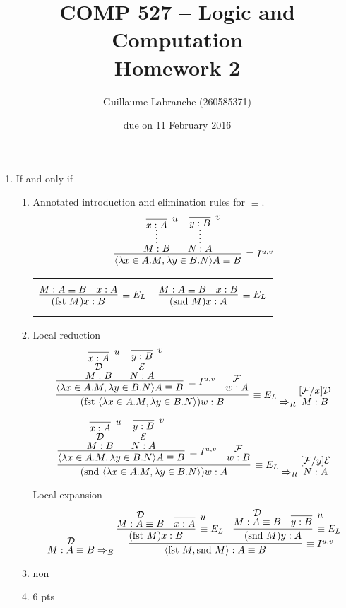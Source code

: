 \documentclass{article}
\author{Guillaume Labranche (260585371)}
\title{COMP 527 -- Logic and Computation\\Homework 2}
\date{due on 11 February 2016}
\renewcommand{\t}{\text{}}
\newcommand{\fst}{\text{fst }}
\newcommand{\snd}{\text{snd }}
\begin{document}
\maketitle

\begin{enumerate}[label=\textbf{Exercise \arabic*}]


\item If and only if

\begin{enumerate}[label=\textbf{Task \arabic*},leftmargin=1em]
\item Annotated introduction and elimination rules for $\equiv$.
\[
\infer[\equiv I^{u,v}]
  {\langle \lambda x \in A.M,\lambda y \in B.N \rangle A \equiv B \t}
  {\infer*{M:B\t}{\infer[u]{x:A\t}{}} & \infer*{N:A\t}{\infer[v]{y:B\t}{}}}
\]
\begin{tabular}{cc}
$$
\infer[\equiv E_L]
  {(\fst M) x : B \t}
  {M:A \equiv B \t & x : A \t}
$$
&
$$
\infer[\equiv E_L]
  {(\snd M) x : A \t}
  {M:A \equiv B \t & x : B \t}
$$
\end{tabular}

\item Local reduction %
\[
\infer[\equiv E_L]
  { (\fst \langle \lambda x \in A.M,\lambda y \in B.N \rangle) w : B \t}
  {\infer[\equiv I^{u,v}]
    {\langle \lambda x \in A.M,\lambda y \in B.N \rangle A \equiv B \t}
    {\deduce[\mathcal{D}]{M:B\t}{\infer[u]{x:A\t}{}}
     & \deduce[\mathcal{E}]{N:A\t}{\infer[v]{y:B\t}{}}
     }
  & \deduce[\mathcal{F}]{w:A \t}{}
  }
\Rightarrow_R
\deduce[{[}\mathcal{F}/x{]}\mathcal{D}]
  {M:B \t}
  {}
\]

\[
\infer[\equiv E_L]
  { (\snd \langle \lambda x \in A.M,\lambda y \in B.N \rangle) w : A \t}
  {\infer[\equiv I^{u,v}]
    {\langle \lambda x \in A.M,\lambda y \in B.N \rangle A \equiv B \t}
    {\deduce[\mathcal{D}]{M:B\t}{\infer[u]{x:A\t}{}}
     & \deduce[\mathcal{E}]{N:A\t}{\infer[v]{y:B\t}{}}
     }
  & \deduce[\mathcal{F}]{w:B \t}{}
  }
\Rightarrow_R
\deduce[{[}\mathcal{F}/y{]}\mathcal{E}]
  {N:A \t}
  {}
\]

Local expansion %
\[
\deduce[\mathcal{D}]{M : A \equiv B \t}{}
\Rightarrow_E
\infer[\equiv I^{u,v}]
  {\langle \fst M, \snd M \rangle : A \equiv B \t}
  {\infer[\equiv E_L]
    {(\fst M)x : B \t}
    {\deduce[\mathcal{D}]{M : A \equiv B \t}{}
    & \infer[u]{x:A \t}{}}
  &\infer[\equiv E_L]
    {(\snd M)y : A \t}
    {\deduce[\mathcal{D}]{M : A \equiv B \t}{}
    & \infer[u]{y:B \t}{}}
  }
\]

\item non
\item 6 pts
\end{enumerate}


\end{enumerate}
\end{document}
